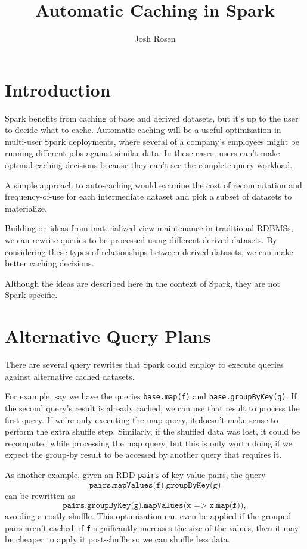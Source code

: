 \documentclass[12pt]{article}
\title{Automatic Caching in Spark}
\author{Josh Rosen}
\begin{document}
\maketitle

\section{Introduction}

Spark benefits from caching of base and derived datasets, but it's up to the
user to decide what to cache.  Automatic caching will be a useful optimization
in multi-user Spark deployments, where several of a company's employees might
be running different jobs against similar data.  In these cases, users can't
make optimal caching decisions because they can't see the complete query
workload.

A simple approach to auto-caching would examine the cost of recomputation and
frequency-of-use for each intermediate dataset and pick a subset of datasets to
materialize.

Building on ideas from materialized view maintenance in traditional RDBMSs, we
can rewrite queries to be processed using different derived datasets.  By
considering these types of relationships between derived datasets, we can make
better caching decisions.

Although the ideas are described here in the context of Spark, they are not
Spark-specific.

\section{Alternative Query Plans}

There are several query rewrites that Spark could employ to execute queries
against alternative cached datasets.

For example, say we have the queries \texttt{base.map(f)} and
\texttt{base.groupByKey(g)}.  If the second query's result is already cached,
we can use that result to process the first query.  If we're only executing
the map query, it doesn't make sense to perform the extra shuffle step.
Similarly, if the shuffled data was lost, it could be recomputed while
processing the map query, but this is only worth doing if we expect the
group-by result to be accessed by another query that requires it.

As another example, given an RDD \texttt{pairs} of key-value pairs, the query
\[\texttt{pairs.mapValues(f).groupByKey(g)}\] can be rewritten as
\[\texttt{pairs.groupByKey(g).mapValues(x => x.map(f))},\] avoiding
a costly shuffle.  This optimization can even be applied if the
grouped pairs aren't cached: if \texttt{f} significantly increases the size of
the values, then it may be cheaper to apply it post-shuffle so we can shuffle
less data.
\end{document}

